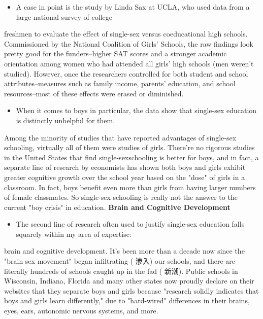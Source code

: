 \documentclass[UTF8,11pt]{ctexart}
\begin{document}
\begin{itemize}[leftmargin=2em,itemsep=.2em,topsep=.4em]\item[E.] A case in point is the study by Linda Sax at UCLA, who used data from a large national survey of college
\end{itemize}

freshmen to evaluate the effect of single-sex versus coeducational high schools. Commissioned by the National Coalition of Girls' Schools, the raw findings look pretty good for the funders--higher SAT scores and a stronger academic orientation among women who had attended all girls' high schools (men weren't studied). However, once the researchers controlled for both student and school attributes--measures such as family income, parents' education, and school resources--most of these effects were erased or diminished.


\begin{itemize}[leftmargin=2em,itemsep=.2em,topsep=.4em]\item[F.] When it comes to boys in particular, the data show that single-sex education is distinctly unhelpful for them.
\end{itemize}

Among the minority of studies that have reported advantages of single-sex schooling, virtually all of them were studies of girls. There're no rigorous studies in the United States that find single-sexschooling is better for boys, and in fact, a separate line of research by economists has shown both boys and girls exhibit greater cognitive growth over the school year based on the "dose" of girls in a classroom. In fact, boys benefit even more than girls from having larger numbers of female classmates. So single-sex schooling is really not the answer to the current "boy crisis" in education. \textbf{Brain and Cognitive Development}


\begin{itemize}[leftmargin=2em,itemsep=.2em,topsep=.4em]\item[G.] The second line of research often used to justify single-sex education falls squarely within my area of expertise:
\end{itemize}

brain and cognitive development. It's been more than a decade now since the "brain sex movement" began infiltrating ( 渗入) our schools, and there are literally hundreds of schools caught up in the fad ( 新潮). Public schools in Wisconsin, Indiana, Florida and many other states now proudly declare on their websites that they separate boys and girls because "research solidly indicates that boys and girls learn differently," due to "hard-wired" differences in their brains, eyes, ears, autonomic nervous systems, and more.
\end{document}
